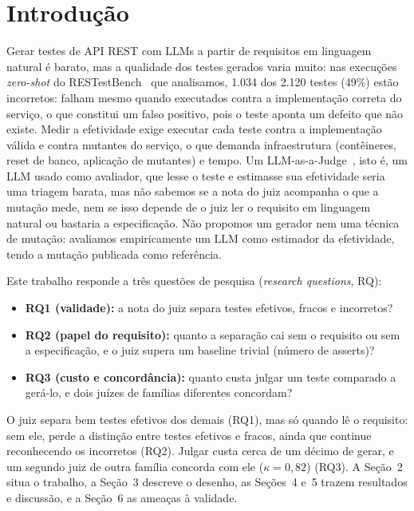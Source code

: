 \documentclass[sigconf,nonacm]{acmart}
\begin{document}
\section{Introdução}
Gerar testes de API REST com LLMs a partir de requisitos em linguagem natural é barato, mas a qualidade dos
testes gerados varia muito: nas execuções \emph{zero-shot} do RESTestBench~\cite{restestbench} que analisamos, 1.034 dos 2.120 testes
(49\%) estão incorretos: falham mesmo quando executados contra a implementação correta do serviço, o que
constitui um falso positivo, pois o teste aponta um defeito que não existe. Medir a efetividade exige executar cada teste
contra a implementação válida e contra mutantes do serviço, o que demanda infraestrutura (contêineres, reset
de banco, aplicação de mutantes) e tempo. Um LLM-as-a-Judge~\cite{zheng2023judging}, isto é, um LLM usado como
avaliador, que lesse o teste e estimasse sua efetividade seria uma triagem barata, mas não sabemos se a nota
do juiz acompanha o que a mutação mede, nem se isso depende de o juiz ler o requisito em linguagem natural
ou bastaria a especificação. Não propomos um gerador nem uma técnica de mutação: avaliamos empiricamente um
LLM como estimador da efetividade, tendo a mutação publicada como referência.

Este trabalho responde a três questões de pesquisa (\emph{research questions}, RQ):
\begin{itemize}
  \item \textbf{RQ1 (validade):} a nota do juiz separa testes efetivos, fracos e incorretos?
  \item \textbf{RQ2 (papel do requisito):} quanto a separação cai sem o requisito ou sem a especificação, e o
        juiz supera um baseline trivial (número de asserts)?
  \item \textbf{RQ3 (custo e concordância):} quanto custa julgar um teste comparado a gerá-lo, e dois juízes
        de famílias diferentes concordam?
\end{itemize}
O juiz separa bem testes efetivos dos demais (RQ1), mas só quando lê o requisito: sem ele, perde a
distinção entre testes efetivos e fracos, ainda que continue reconhecendo os incorretos (RQ2). Julgar custa
cerca de um décimo de gerar, e um segundo juiz de outra família concorda com ele ($\kappa=0{,}82$) (RQ3). A Seção~2 situa o trabalho, a Seção~3
descreve o desenho, as Seções~4 e~5 trazem resultados e discussão, e a Seção~6 as ameaças à validade.
\end{document}
